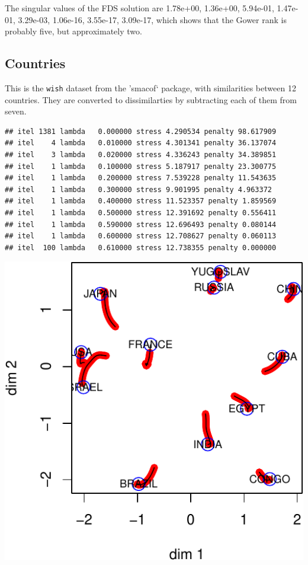 \documentclass[
  12pt,
]{article}
\begin{document}
The singular values of the FDS solution are 1.78e+00, 1.36e+00,
5.94e-01, 1.47e-01, 3.29e-03, 1.06e-16, 3.55e-17, 3.09e-17, which shows
that the Gower rank is probably five, but approximately two.

\hypertarget{countries}{%
\subsection{Countries}\label{countries}}

This is the \texttt{wish} dataset from the 'smacof` package, with
similarities between 12 countries. They are converted to dissimilarties
by subtracting each of them from seven.

\begin{verbatim}
## itel 1381 lambda   0.000000 stress 4.290534 penalty 98.617909 
## itel    4 lambda   0.010000 stress 4.301341 penalty 36.137074 
## itel    3 lambda   0.020000 stress 4.336243 penalty 34.389851 
## itel    1 lambda   0.100000 stress 5.187917 penalty 23.300775 
## itel    1 lambda   0.200000 stress 7.539228 penalty 11.543635 
## itel    1 lambda   0.300000 stress 9.901995 penalty 4.963372 
## itel    1 lambda   0.400000 stress 11.523357 penalty 1.859569 
## itel    1 lambda   0.500000 stress 12.391692 penalty 0.556411 
## itel    1 lambda   0.590000 stress 12.696493 penalty 0.080144 
## itel    1 lambda   0.600000 stress 12.708627 penalty 0.060113 
## itel  100 lambda   0.610000 stress 12.738355 penalty 0.000000
\end{verbatim}

\begin{center}\includegraphics{penalty_files/figure-latex/countries-1} \end{center}
\end{document}
